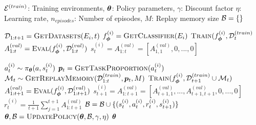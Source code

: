 
\begin{algorithmic}[1]
\Require ${\mathcal{E}}^{(train)}$: Training environments, ${\bm{\theta}}$: Policy parameters, $\gamma$: Discount factor
\Require $\eta$: Learning rate, $n_{episodes}$: Number of episodes, $M$: Replay memory size
\State ${\mathcal{B}} = \{\}$ 


\State ${\mathcal{D}}_{1:t+1} = \textsc{GetDatasets}(E_i, t)$ 
\State $f_{{\bm{\phi}}}^{(i)} = \textsc{GetClassifier}(E_i)$ 
\State $\textsc{Train}(f_{{\bm{\phi}}}^{(i)}, {\mathcal{D}}_{t}^{(train)}$ 
\State $A_{1:t}^{(val)} = \textsc{Eval}(f_{{\bm{\phi}}}^{(i)}, {\mathcal{D}}_{1:t}^{(val)})$ 
\State $s_{t}^{(i)} = A_{1:t}^{(val)} = [A_{1, 1}^{(val)}, 0, ..., 0]$ 
\EndIf 

\State $a_t^{(i)} \sim \pi_{{\bm{\theta}}}(a, s_t^{(i)})$ 
\State ${\bm{p}}_t = \textsc{GetTaskProportion}(a_t^{(i)})$ %
\State ${\mathcal{M}}_t \sim \textsc{GetReplayMemory}({\mathcal{D}}_{1:t}^{(train)}, {\bm{p}}_t, M)$ %
\State $\textsc{Train}(f_{{\bm{\phi}}}^{(i)}, {\mathcal{D}}_{t+1}^{(train)} \cup {\mathcal{M}}_t)$ 
\State $A_{1:t+1}^{(val)} = \textsc{Eval}(f_{{\bm{\phi}}}^{(i)}, {\mathcal{D}}_{1:t+1}^{(val)})$ 
\State $s_{t+1}^{(i)} = A_{1:t+1}^{(val)} = [A_{t+1, 1}^{(val)}, ..., A_{t+1, t+1}^{(val)}, 0, ..., 0]$ 
\State $r_{t}^{(i)} = \frac{1}{t+1}\sum_{j=1}^{t+1} A_{1:t+1}^{(val)}$ 
\State ${\mathcal{B}} = {\mathcal{B}} \cup \{(s_{t}^{(i)}, a_{t}^{(i)}, r_{t}^{(i)}, s_{t+1}^{(i)})\}$ 
\State ${\bm{\theta}}, {\mathcal{B}} = \textsc{UpdatePolicy}({\bm{\theta}}, {\mathcal{B}}, \gamma, \eta)$ 
\EndIf 
\EndFor
\EndFor
\EndFor 
\State \Return ${\bm{\theta}}$ 	
\end{algorithmic}